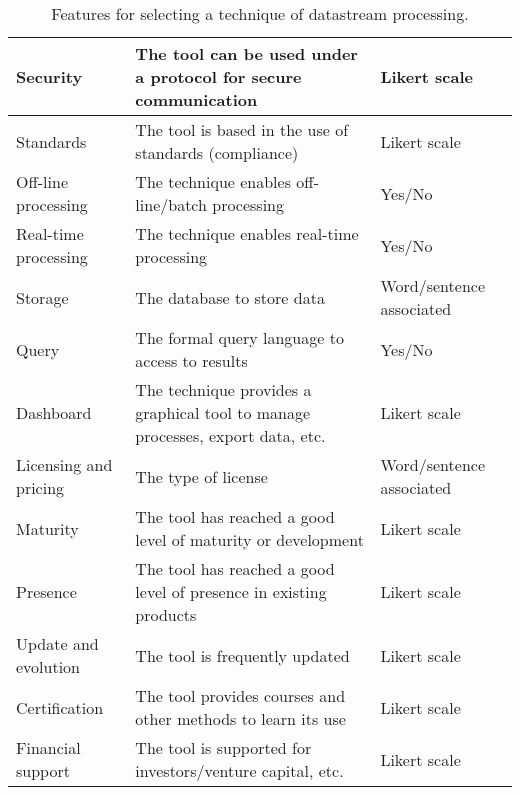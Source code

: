 \begin{table}[!ht]
\begin{center}
\begin{tabular}[c]{|p{2.5cm}|p{5cm}|p{3cm}|}
  Security & The tool can be used under a protocol for secure communication & Likert scale  \\ \hline
  Standards & The tool is based in the use of standards (compliance) & Likert scale\ \\ \hline
  Off-line processing & The technique enables off-line/batch processing & Yes/No  \\ \hline
  Real-time processing & The technique enables real-time processing & Yes/No  \\ \hline
  Storage & The database to store data &  Word/sentence associated \\ \hline
  Query & The formal query language to access to results & Yes/No\\ \hline
  Dashboard & The technique provides a graphical tool to manage processes, export data, etc. & Likert scale\ \\ \hline
  Licensing and pricing & The type of license & Word/sentence associated \\ \hline
  Maturity & The tool has reached a good level of maturity or development & Likert scale\\ \hline
  Presence & The tool has reached a good level of presence in existing products & Likert scale\\ \hline
  Update and evolution & The tool is frequently updated & Likert scale\\ \hline
  Certification & The tool provides courses and other methods to learn its use & Likert scale\\ \hline
  Financial support & The tool is supported for investors/venture capital, etc. & Likert scale\\ \hline
\hline
\end{tabular}
\caption{Features for selecting a technique of datastream processing.}\label{features-techniques}
  \end{center}
\end{table} 


